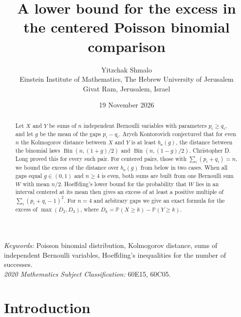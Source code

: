 \documentclass[11pt,a4paper]{article}
\title{A lower bound for the excess in the centered Poisson binomial comparison}
\author{Yitzchak Shmalo\\[0.4em]
\small Einstein Institute of Mathematics, The Hebrew University of Jerusalem\\
\small Givat Ram, Jerusalem, Israel}
\date{19 November 2026}
\numberwithin{equation}{section}
\theoremstyle{remark}
\newcommand{\Pp}{\mathbb P}
\newcommand{\Bin}{\operatorname{Bin}}
\begin{document}
\maketitle
\thispagestyle{fancy}

\begin{abstract}
Let $X$ and $Y$ be sums of $n$ independent Bernoulli variables with parameters $p_i\ge q_i$, and let $g$ be the mean of the gaps $p_i-q_i$. Aryeh Kontorovich conjectured that for even $n$ the Kolmogorov distance between $X$ and $Y$ is at least $b_n(g)$, the distance between the binomial laws $\Bin(n,(1+g)/2)$ and $\Bin(n,(1-g)/2)$. Christopher D. Long proved this for every such pair. For centered pairs, those with $\sum_i(p_i+q_i)=n$, we bound the excess of the distance over $b_n(g)$ from below in two cases. When all gaps equal $g\in(0,1)$ and $n\ge4$ is even, both sums are built from one Bernoulli sum $W$ with mean $n/2$. Hoeffding's lower bound for the probability that $W$ lies in an interval centered at its mean then gives an excess of at least a positive multiple of $\sum_i(p_i+q_i-1)^2$. For $n=4$ and arbitrary gaps we give an exact formula for the excess of $\max(D_2,D_3)$, where $D_k=\Pp(X\ge k)-\Pp(Y\ge k)$.
\end{abstract}

\noindent\textit{Keywords:} Poisson binomial distribution, Kolmogorov distance, sums of independent Bernoulli variables, Hoeffding's inequalities for the number of successes.\\
\textit{2020 Mathematics Subject Classification:} 60E15, 60C05.

\section{Introduction}\label{sec:intro}
\end{document}
